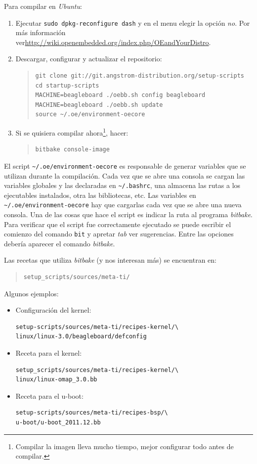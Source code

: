 \documentclass[main]{subfiles}
\begin{document}
Para compilar en \textit{Ubuntu}:
\begin{enumerate}
\item Ejecutar \verb+sudo dpkg-reconfigure dash+ y en el menu elegir la opción \textit{no}. Por más información ver\newline\url{http://wiki.openembedded.org/index.php/OEandYourDistro}.
\item Descargar, configurar y actualizar el repositorio:
\begin{quote}
\begin{verbatim}
git clone git://git.angstrom-distribution.org/setup-scripts
cd startup-scripts
MACHINE=beagleboard ./oebb.sh config beagleboard
MACHINE=beagleboard ./oebb.sh update
source ~/.oe/environment-oecore
\end{verbatim}
\end{quote}
\item Si se quisiera compilar ahora\footnote{Compilar la imagen lleva mucho tiempo, mejor configurar todo antes de compilar.}, hacer:
\begin{quote}
\begin{verbatim}
bitbake console-image
\end{verbatim}
\end{quote}
\end{enumerate}

El script \verb+~/.oe/environment-oecore+ es responsable de generar variables que se utilizan durante la compilación. Cada vez que se abre una consola se cargan las variables globales y las declaradas en \verb+~/.bashrc+, una almacena las rutas a los ejecutables instalados, otra las bibliotecas, etc. Las variables en \verb+~/.oe/environment-oecore+ hay que cargarlas cada vez que se abre una nueva consola. Una de las cosas que hace el script es indicar la ruta al programa \textit{bitbake}. Para verificar que el script fue correctamente ejecutado se puede escribir el comienzo del comando \verb+bit+ y apretar \textit{tab} ver sugerencias. Entre las opciones debería aparecer el comando \textit{bitbake}.

Las recetas que utiliza \textit{bitbake} (y nos interesan más) se encuentran en:
\begin{quote}
\begin{verbatim}
setup_scripts/sources/meta-ti/
\end{verbatim}
\end{quote}
Algunos ejemplos:
\begin{itemize}
\item Configuración del kernel:
\begin{verbatim}
setup-scripts/sources/meta-ti/recipes-kernel/\
linux/linux-3.0/beagleboard/defconfig
\end{verbatim}
\item Receta para el kernel:
\begin{verbatim}
setup_scripts/sources/meta-ti/recipes-kernel/\
linux/linux-omap_3.0.bb
\end{verbatim}
\item Receta para el u-boot:
\begin{verbatim}
setup-scripts/sources/meta-ti/recipes-bsp/\
u-boot/u-boot_2011.12.bb
\end{verbatim}
\end{itemize}
\end{document}
